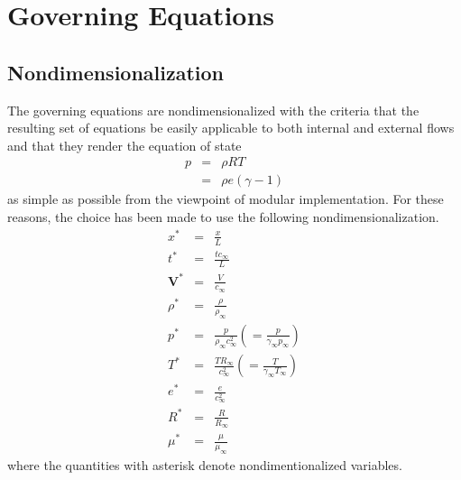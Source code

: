 
\section{Governing Equations}

\subsection{Nondimensionalization}

The governing equations are nondimensionalized with the criteria that the resulting set of equations be easily applicable to both internal and external flows and that they render the equation of state
\begin{eqnarray*}
p &=& \rho R T \\
  &=& \rho e \left(\gamma - 1\right)
\end{eqnarray*}
as simple as possible from the viewpoint of modular implementation. For these reasons, the choice has been made to use the following nondimensionalization.
\begin{eqnarray*}
x^* &=& \frac{x}{L} \\
t^* &=& \frac{t c_{\infty}}{L} \\
\mathbf{V}^* &=& \frac{V}{c_{\infty}} \\
\rho^* &=& \frac{\rho}{\rho_\infty} \\
p^* &=& \frac{p}{\rho_\infty c_\infty^2} \left( = \frac{p}{\gamma_\infty p_\infty} \right) \\
T^* &=& \frac{T R_\infty}{c_\infty^2} \left( = \frac{T}{\gamma_\infty T_\infty} \right) \\
e^* &=& \frac{e}{c_\infty^2} \\
R^* &=& \frac{R}{R_\infty} \\
\mu^* &=& \frac{\mu}{\mu_\infty}
\end{eqnarray*}
where the quantities with asterisk denote nondimentionalized variables.

